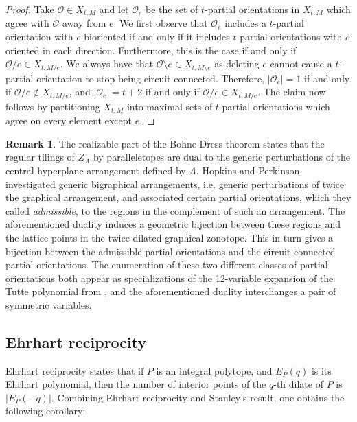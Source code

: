 \documentclass[12pt]{amsart}
\numberwithin{equation}{section}
\theoremstyle{definition}
\newtheorem{remark}[theorem]{Remark}
\begin{document}
\begin{proof}
Take $\mathcal{O} \in X_{t,M}$ and let $\mathcal{O}_e$ be the set of $t$-partial orientations in $X_{t,M}$ which agree with $\mathcal{O}$ away from $e$.  We first observe that $\mathcal{O}_e$ includes a $t$-partial orientation with $e$ bioriented if and only if it includes $t$-partial orientations with $e$ oriented in each direction.  Furthermore, this is the case if and only if $\mathcal{O}/e \in X_{t,M/ e}$.  We always have that $\mathcal{O} \setminus e \in X_{t,M \setminus e}$ as deleting $e$ cannot cause a $t$-partial orientation to stop being circuit connected. Therefore, $|\mathcal{O}_e| =1 $ if and only if $\mathcal{O}/e \notin X_{t,M/e}$, and $|\mathcal{O}_e| = t+2 $ if and only if $\mathcal{O}/e \in X_{t,M/e}$.  The claim now follows by partitioning  $X_{t,M}$ into maximal sets of $t$-partial orientations which agree on every element except $e$.  
\end{proof}



\begin{remark}
The realizable part of the Bohne-Dress theorem states that the regular tilings of $Z_A$ by paralleletopes are dual to the generic perturbations of the central hyperplane arrangement defined by $A$. Hopkins and Perkinson \cite{hopkins2016bigraphical} investigated generic bigraphical arrangements, i.e. generic perturbations of twice the graphical arrangement,  and associated certain partial orientations, which they called {\it admissible}, to the regions in the complement of such an arrangement.  The aforementioned duality induces a geometric bijection between these regions and the lattice points in the twice-dilated graphical zonotope.  This in turn gives a bijection between the admissible partial orientations and the circuit connected partial orientations.  The enumeration of these two different classes of partial orientations both appear as specializations of the 
12-variable expansion of the Tutte polynomial from \cite{backman2015fourientation}, and the aforementioned duality interchanges a pair of symmetric variables.
\end{remark}

\subsection{Ehrhart reciprocity}\label{Ehrhartrec}



 Ehrhart reciprocity states that if $P$ is an integral polytope, and $E_P(q)$ is its Ehrhart polynomial, then the number of interior points of the $q$-th dilate of $P$ is $|E_P(-q)|$. Combining Ehrhart reciprocity and Stanley's result, one obtains the following corollary:
 
\end{document}
